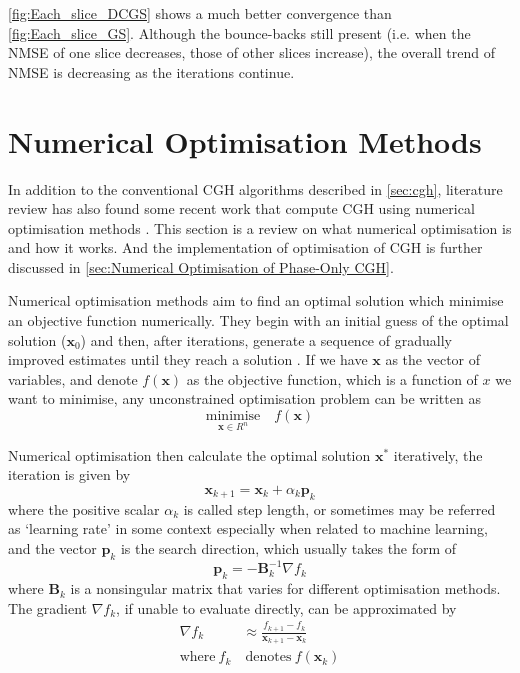 \cref{fig:Each_slice_DCGS} shows a much better convergence than \cref{fig:Each_slice_GS}. Although the bounce-backs still present (i.e. when the NMSE of one slice decreases, those of other slices increase), the overall trend of NMSE is decreasing as the iterations continue.


\newpage
\section{Numerical Optimisation Methods} \label{sec:Numerical Optimisation Methods}
In addition to the conventional CGH algorithms described in \cref{sec:cgh}, literature review has also found some recent work that compute CGH using numerical optimisation methods \cite{Zhang2017, Liu2020, Choi2021, Chen2021, Kadis2022}. This section is a review on what numerical optimisation is and how it works. And the implementation of optimisation of CGH is further discussed in \cref{sec:Numerical Optimisation of Phase-Only CGH}.

Numerical optimisation methods aim to find an optimal solution which minimise an objective function numerically. They begin with an initial guess of the optimal solution ($\textbf{x}_{0}$) and then, after iterations, generate a sequence of gradually improved estimates until they reach a solution \cite{Nocedal2006}. If we have $\textbf{x}$ as the vector of variables, and denote $f(\textbf{x})$ as the objective function, which is a function of $x$ we want to minimise, any unconstrained optimisation problem can be written as
\begin{equation}
  \underset{\textbf{x}\in R^n}{\text{minimise}}\quad f(\textbf{x})
  \label{eq:minimise_F}
\end{equation}

Numerical optimisation then calculate the optimal solution $\textbf{x}^*$ iteratively, the iteration is given by
\begin{equation}
  \textbf{x}_{k+1} = \textbf{x}_k+\alpha_k \textbf{p}_k
  \label{eq:optimisation_iteration}
\end{equation}
where the positive scalar $\alpha_k$ is called step length, or sometimes may be referred as `learning rate' in some context especially when related to machine learning, and the vector $\textbf{p}_k$ is the search direction, which usually takes the form of
\begin{equation}
  \textbf{p}_k = -\textbf{B}_k^{-1} \nabla f_{k} \label{eq:general-descent-direction}
\end{equation}
where $\textbf{B}_k$ is a nonsingular matrix that varies for different optimisation methods. The gradient $\nabla f_k$, if unable to evaluate directly, can be approximated by
\begin{align}
  \nabla f_k         & \approx \frac{f_{k+1}-f_{k}}{\textbf{x}_{k+1}-\textbf{x}_{k}} \nonumber \\
  \text{where}\  f_k & \ \text{denotes}\  f(\textbf{x}_k)
\end{align}

